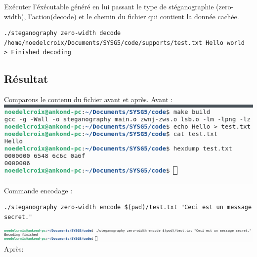 Exécuter l'éxécutable généré en lui passant le type de stéganographie (zero-width), l'action(decode) et le chemin du fichier qui contient la donnée cachée.
\begin{lstlisting}
./steganography zero-width decode /home/noedelcroix/Documents/SYSG5/code/supports/test.txt Hello world
> Finished decoding
\end{lstlisting}
\subsection{Résultat}
Comparons le contenu du fichier avant et après.
\newline
Avant : 
\newline
\includegraphics[width=1\textwidth]{img/resultat_before_zero-width.png}
Commande encodage :
\begin{lstlisting}
./steganography zero-width encode $(pwd)/test.txt "Ceci est un message secret."
\end{lstlisting}
\includegraphics[width=1\textwidth]{img/resultat_commande_zero-width.png}
\newline
Après:
\newline
